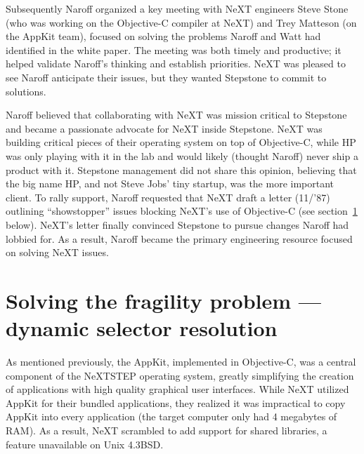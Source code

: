 \documentclass[acmsmall]{acmart}\settopmatter{}
\begin{document}
Subsequently Naroff organized a key meeting with NeXT engineers Steve Stone (who was working on the Objective-C compiler at NeXT) and Trey Matteson (on the AppKit team), focused on solving the problems Naroff and Watt had identified in the white paper. The meeting was both timely and productive; it helped validate Naroff's thinking and establish priorities. NeXT was pleased to see Naroff anticipate their issues, but they wanted Stepstone to commit to solutions.

Naroff believed that collaborating with NeXT was mission critical to Stepstone and became a passionate advocate for NeXT inside Stepstone. NeXT was building critical pieces of their operating system on top of Objective-C, while HP was only playing with it in the lab and would likely (thought Naroff) never ship a product with it. Stepstone management did not share this opinion, believing that the big name HP, and not Steve Jobs' tiny startup, was the more important client. To rally support, Naroff requested that NeXT draft a letter (11/'87) outlining ``showstopper'' issues blocking NeXT's use of Objective-C (see section~\ref{sec-solvingfragility} below). NeXT's letter finally convinced Stepstone to pursue changes Naroff had lobbied for. As a result, Naroff became the primary engineering resource focused on solving NeXT issues.
\section{Solving the fragility problem --- dynamic selector resolution}
\label{sec-solvingfragility}
As mentioned previously, the AppKit, implemented in Objective-C, was a central component of the NeXTSTEP operating system, greatly simplifying the creation of applications with high quality graphical user interfaces. While NeXT utilized AppKit for their bundled applications, they realized it was impractical to copy AppKit into every application (the target computer only had 4 megabytes of RAM). As a result, NeXT scrambled to add support for shared libraries, a feature unavailable on Unix 4.3BSD. 
\end{document}
